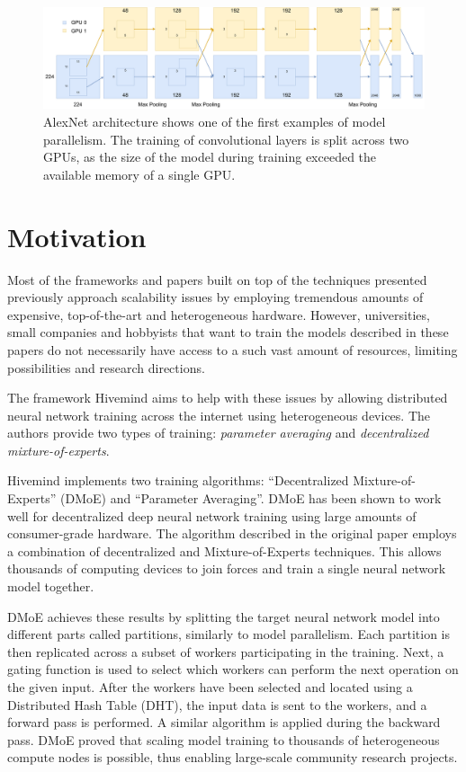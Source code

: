 \begin{figure}[h]
    \caption{AlexNet \cite{alexnet2012} architecture shows one of the first examples of model parallelism. The training of convolutional layers is split across two GPUs, as the size of the model during training exceeded the available memory of a single GPU.}
    \label{fig:alexnet}
    \includegraphics[width=\textwidth]{./figures/alexnet.pdf}
\end{figure}

\section{Motivation}

Most of the frameworks and papers built on top of the techniques presented previously approach scalability issues by employing tremendous amounts of expensive, top-of-the-art and heterogeneous hardware.
However, universities, small companies and hobbyists that want to train the models described in these papers do not necessarily have access to a such vast amount of resources, limiting possibilities and research directions.

The framework Hivemind \cite{riabinin2020hivemind} aims to help with these issues by allowing distributed neural network training across the internet using heterogeneous devices.
The authors provide two types of training: \textit{parameter averaging} and \textit{decentralized mixture-of-experts}.

Hivemind implements two training algorithms: ``Decentralized Mixture-of-Experts'' (DMoE) \cite{ryabinin2020learning} and ``Parameter Averaging''.
DMoE has been shown to work well for decentralized deep neural network training using large amounts of consumer-grade hardware.
The algorithm described in the original paper employs a combination of decentralized and Mixture-of-Experts \cite{shazeer2017outrageously} techniques.
This allows thousands of computing devices to join forces and train a single neural network model together.

DMoE achieves these results by splitting the target neural network model into different parts called partitions, similarly to model parallelism.
Each partition is then replicated across a subset of workers participating in the training.
Next, a gating function is used to select which workers can perform the next operation on the given input.
After the workers have been selected and located using a Distributed Hash Table (DHT), the input data is sent to the workers, and a forward pass is performed.
A similar algorithm is applied during the backward pass.
DMoE proved that scaling model training to thousands of heterogeneous compute nodes is possible, thus enabling large-scale community research projects.

